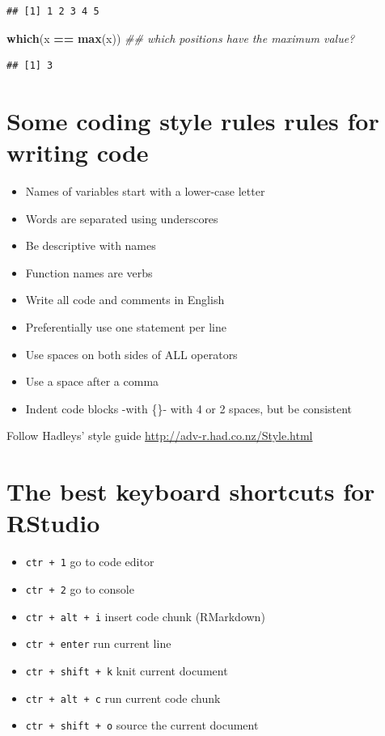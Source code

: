 \documentclass[]{book}
\newenvironment{Shaded}{\begin{snugshade}}{\end{snugshade}}
\newcommand{\CommentTok}[1]{\textcolor[rgb]{0.56,0.35,0.01}{\textit{#1}}}
\newcommand{\KeywordTok}[1]{\textcolor[rgb]{0.13,0.29,0.53}{\textbf{#1}}}
\newcommand{\NormalTok}[1]{#1}
\newcommand{\OperatorTok}[1]{\textcolor[rgb]{0.81,0.36,0.00}{\textbf{#1}}}
\newcommand{\StringTok}[1]{\textcolor[rgb]{0.31,0.60,0.02}{#1}}
\providecommand{\tightlist}{%
  \setlength{\itemsep}{0pt}\setlength{\parskip}{0pt}}
\begin{document}
\begin{verbatim}
## [1] 1 2 3 4 5
\end{verbatim}

\begin{Shaded}
\begin{Highlighting}[]
\KeywordTok{which}\NormalTok{(x }\OperatorTok{==}\StringTok{ }\KeywordTok{max}\NormalTok{(x)) }\CommentTok{## which positions have the maximum value?}
\end{Highlighting}
\end{Shaded}

\begin{verbatim}
## [1] 3
\end{verbatim}

\hypertarget{some-coding-style-rules-rules-for-writing-code}{%
\section{Some coding style rules rules for writing code}\label{some-coding-style-rules-rules-for-writing-code}}

\begin{itemize}
\tightlist
\item
  Names of variables start with a lower-case letter
\item
  Words are separated using underscores
\item
  Be descriptive with names
\item
  Function names are verbs
\item
  Write all code and comments in English
\item
  Preferentially use one statement per line
\item
  Use spaces on both sides of ALL operators
\item
  Use a space after a comma
\item
  Indent code blocks -with \{\}- with 4 or 2 spaces, but be consistent
\end{itemize}

Follow Hadleys' style guide \url{http://adv-r.had.co.nz/Style.html}

\hypertarget{the-best-keyboard-shortcuts-for-rstudio}{%
\section{The best keyboard shortcuts for RStudio}\label{the-best-keyboard-shortcuts-for-rstudio}}

\begin{itemize}
\tightlist
\item
  \texttt{ctr\ +\ 1} go to code editor
\item
  \texttt{ctr\ +\ 2} go to console
\item
  \texttt{ctr\ +\ alt\ +\ i} insert code chunk (RMarkdown)
\item
  \texttt{ctr\ +\ enter} run current line
\item
  \texttt{ctr\ +\ shift\ +\ k} knit current document
\item
  \texttt{ctr\ +\ alt\ +\ c} run current code chunk
\item
  \texttt{ctr\ +\ shift\ +\ o} source the current document
\end{itemize}
\end{document}
